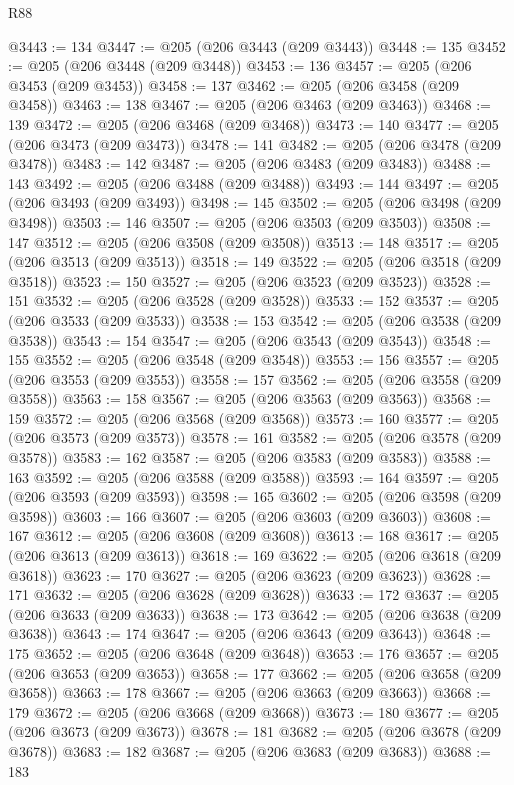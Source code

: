 \begin{lexlean}{R88}
\begin{coremodule}
@3443 := 134
@3447 := @205 (@206 @3443 (@209 @3443))
@3448 := 135
@3452 := @205 (@206 @3448 (@209 @3448))
@3453 := 136
@3457 := @205 (@206 @3453 (@209 @3453))
@3458 := 137
@3462 := @205 (@206 @3458 (@209 @3458))
@3463 := 138
@3467 := @205 (@206 @3463 (@209 @3463))
@3468 := 139
@3472 := @205 (@206 @3468 (@209 @3468))
@3473 := 140
@3477 := @205 (@206 @3473 (@209 @3473))
@3478 := 141
@3482 := @205 (@206 @3478 (@209 @3478))
@3483 := 142
@3487 := @205 (@206 @3483 (@209 @3483))
@3488 := 143
@3492 := @205 (@206 @3488 (@209 @3488))
@3493 := 144
@3497 := @205 (@206 @3493 (@209 @3493))
@3498 := 145
@3502 := @205 (@206 @3498 (@209 @3498))
@3503 := 146
@3507 := @205 (@206 @3503 (@209 @3503))
@3508 := 147
@3512 := @205 (@206 @3508 (@209 @3508))
@3513 := 148
@3517 := @205 (@206 @3513 (@209 @3513))
@3518 := 149
@3522 := @205 (@206 @3518 (@209 @3518))
@3523 := 150
@3527 := @205 (@206 @3523 (@209 @3523))
@3528 := 151
@3532 := @205 (@206 @3528 (@209 @3528))
@3533 := 152
@3537 := @205 (@206 @3533 (@209 @3533))
@3538 := 153
@3542 := @205 (@206 @3538 (@209 @3538))
@3543 := 154
@3547 := @205 (@206 @3543 (@209 @3543))
@3548 := 155
@3552 := @205 (@206 @3548 (@209 @3548))
@3553 := 156
@3557 := @205 (@206 @3553 (@209 @3553))
@3558 := 157
@3562 := @205 (@206 @3558 (@209 @3558))
@3563 := 158
@3567 := @205 (@206 @3563 (@209 @3563))
@3568 := 159
@3572 := @205 (@206 @3568 (@209 @3568))
@3573 := 160
@3577 := @205 (@206 @3573 (@209 @3573))
@3578 := 161
@3582 := @205 (@206 @3578 (@209 @3578))
@3583 := 162
@3587 := @205 (@206 @3583 (@209 @3583))
@3588 := 163
@3592 := @205 (@206 @3588 (@209 @3588))
@3593 := 164
@3597 := @205 (@206 @3593 (@209 @3593))
@3598 := 165
@3602 := @205 (@206 @3598 (@209 @3598))
@3603 := 166
@3607 := @205 (@206 @3603 (@209 @3603))
@3608 := 167
@3612 := @205 (@206 @3608 (@209 @3608))
@3613 := 168
@3617 := @205 (@206 @3613 (@209 @3613))
@3618 := 169
@3622 := @205 (@206 @3618 (@209 @3618))
@3623 := 170
@3627 := @205 (@206 @3623 (@209 @3623))
@3628 := 171
@3632 := @205 (@206 @3628 (@209 @3628))
@3633 := 172
@3637 := @205 (@206 @3633 (@209 @3633))
@3638 := 173
@3642 := @205 (@206 @3638 (@209 @3638))
@3643 := 174
@3647 := @205 (@206 @3643 (@209 @3643))
@3648 := 175
@3652 := @205 (@206 @3648 (@209 @3648))
@3653 := 176
@3657 := @205 (@206 @3653 (@209 @3653))
@3658 := 177
@3662 := @205 (@206 @3658 (@209 @3658))
@3663 := 178
@3667 := @205 (@206 @3663 (@209 @3663))
@3668 := 179
@3672 := @205 (@206 @3668 (@209 @3668))
@3673 := 180
@3677 := @205 (@206 @3673 (@209 @3673))
@3678 := 181
@3682 := @205 (@206 @3678 (@209 @3678))
@3683 := 182
@3687 := @205 (@206 @3683 (@209 @3683))
@3688 := 183

\end{coremodule}
\end{lexlean}
